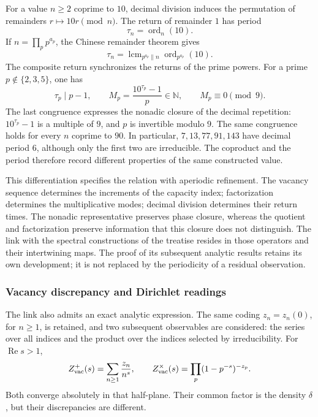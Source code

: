 For a value \(n\geq2\) coprime to \(10\), decimal division induces the
permutation of remainders \(r\mapsto10r\pmod n\). The return of remainder
\(1\) has period
\[
 \tau_n=\operatorname{ord}_n(10).
\]
If \(n=\prod_p p^{a_p}\), the Chinese remainder theorem gives
\[
 \tau_n=\operatorname{lcm}_{p^{a_p}\parallel n}
                    \operatorname{ord}_{p^{a_p}}(10).
\]
The composite return synchronizes the returns of the prime powers.
For a prime \(p\notin\{2,3,5\}\), one has
\[
 \tau_p\mid p-1,\qquad
 M_p=\frac{10^{\tau_p}-1}{p}\in\mathbb N,
 \qquad M_p\equiv0\pmod9.
\]
The last congruence expresses the nonadic closure of the decimal repetition:
\(10^{\tau_p}-1\) is a multiple of \(9\), and \(p\) is invertible modulo
\(9\). The same congruence holds for every \(n\) coprime to
\(90\). In particular, \(7,13,77,91,143\) have decimal period \(6\),
although only the first two are irreducible. The coproduct and the period
therefore record different properties of the same constructed value.

This differentiation specifies the relation with aperiodic refinement.
The vacancy sequence determines the increments of the capacity index;
factorization determines the multiplicative modes; decimal division
determines their return times. The nonadic representative preserves phase
closure, whereas the quotient and factorization preserve information that
this closure does not distinguish. The link with the spectral constructions
of the treatise resides in those operators and their intertwining maps. The
proof of its subsequent analytic results retains its own development; it is
not replaced by the periodicity of a residual observation.

\subsubsection{Vacancy discrepancy and Dirichlet readings}

The link also admits an exact analytic expression. The same coding
\(z_n=z_n(0)\), for \(n\geq1\), is retained, and two subsequent
observables are considered: the series over all indices and the product
over the indices selected by irreducibility. For
\(\operatorname{Re}s>1\),
\[
 Z_{\rm vac}^{+}(s)=\sum_{n\geq1}\frac{z_n}{n^s},\qquad
 Z_{\rm vac}^{\times}(s)=\prod_p(1-p^{-s})^{-z_p}.
\]
Both converge absolutely in that half-plane. Their common factor is the
density \(\delta\), but their discrepancies are different.

